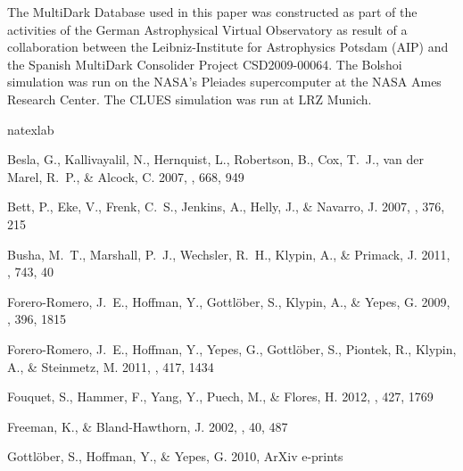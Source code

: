 \documentclass{emulateapj}
\begin{document}
The MultiDark Database used in this paper  was constructed as part of
the activities of the German Astrophysical Virtual Observatory as
result of a collaboration between the Leibniz-Institute for
Astrophysics Potsdam (AIP) and the Spanish MultiDark Consolider
Project CSD2009-00064. The Bolshoi simulation was run on the NASA's
Pleiades supercomputer at the NASA Ames Research Center. The CLUES simulation
was run at LRZ Munich.





\begin{thebibliography}{30}
\expandafter\ifx\csname natexlab\endcsname\relax\def\natexlab#1{#1}\fi

{Besla}, G., {Kallivayalil}, N., {Hernquist}, L., {Robertson}, B., {Cox},
  T.~J., {van der Marel}, R.~P., \& {Alcock}, C. 2007, \apj, 668, 949

{Bett}, P., {Eke}, V., {Frenk}, C.~S., {Jenkins}, A., {Helly}, J., \&
  {Navarro}, J. 2007, \mnras, 376, 215

{Busha}, M.~T., {Marshall}, P.~J., {Wechsler}, R.~H., {Klypin}, A., \&
  {Primack}, J. 2011, \apj, 743, 40

{Forero-Romero}, J.~E., {Hoffman}, Y., {Gottl{\"o}ber}, S., {Klypin}, A., \&
  {Yepes}, G. 2009, \mnras, 396, 1815

{Forero-Romero}, J.~E., {Hoffman}, Y., {Yepes}, G., {Gottl{\"o}ber}, S.,
  {Piontek}, R., {Klypin}, A., \& {Steinmetz}, M. 2011, \mnras, 417, 1434

{Fouquet}, S., {Hammer}, F., {Yang}, Y., {Puech}, M., \& {Flores}, H. 2012,
  \mnras, 427, 1769

{Freeman}, K., \& {Bland-Hawthorn}, J. 2002, \araa, 40, 487

{Gottl{\"o}ber}, S., {Hoffman}, Y., \& {Yepes}, G. 2010, ArXiv e-prints


\end{thebibliography}
\end{document}
